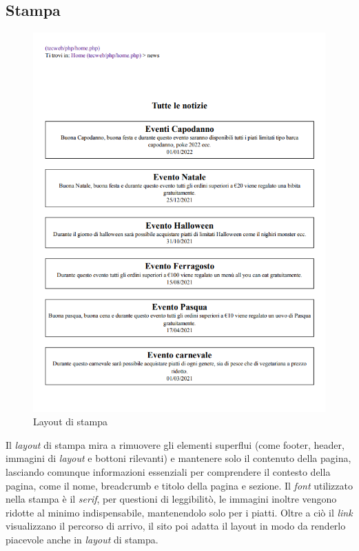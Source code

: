 \documentclass{template}
\begin{document}
	\subsection{Stampa}
	\begin{figure}[H]
		\centering
		\includegraphics[scale=0.55]{src/layout/print.png}
		\caption{Layout di stampa}
	\end{figure}

	Il \textit{layout} di stampa mira a rimuovere gli elementi superflui (come footer, header, immagini di \textit{layout} e bottoni rilevanti) e mantenere solo il contenuto della pagina, lasciando comunque informazioni essenziali per comprendere il contesto della pagina, come il nome, breadcrumb e titolo della pagina e sezione.
	Il \textit{font} utilizzato nella stampa è il \textit{serif}, per questioni di leggibilitò, le immagini inoltre vengono ridotte al minimo indispensabile, mantenendolo solo per i piatti. Oltre a ciò il \textit{link} visualizzano il percorso di arrivo, il sito poi adatta il layout in modo da renderlo piacevole anche in \textit{layout} di stampa.
\end{document}
